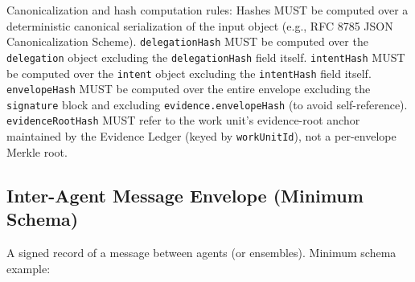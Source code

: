 \documentclass[11pt]{article}
\begin{document}
Canonicalization and hash computation rules: Hashes MUST be computed over a deterministic canonical serialization of the input object (e.g., RFC 8785 JSON Canonicalization Scheme). \texttt{delegationHash} MUST be computed over the \texttt{delegation} object excluding the \texttt{delegationHash} field itself. \texttt{intentHash} MUST be computed over the \texttt{intent} object excluding the \texttt{intentHash} field itself. \texttt{envelopeHash} MUST be computed over the entire envelope excluding the \texttt{signature} block and excluding \texttt{evidence.envelopeHash} (to avoid self-reference). \texttt{evidenceRootHash} MUST refer to the work unit's evidence-root anchor maintained by the Evidence Ledger (keyed by \texttt{workUnitId}), not a per-envelope Merkle root.

\hypertarget{inter-agent-message-envelope-minimum-schema}{%
\subsection{Inter-Agent Message Envelope (Minimum Schema)}\label{inter-agent-message-envelope-minimum-schema}}

A signed record of a message between agents (or ensembles). Minimum
schema example:
\end{document}

